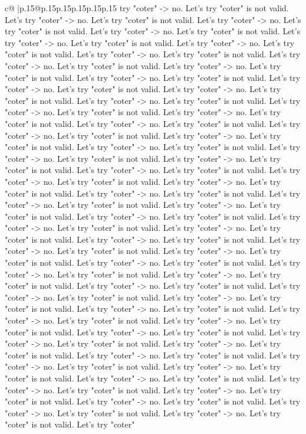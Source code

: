 \documentclass{article}
\begin{document}
{\begin{supertabular}{c@{$\;$}|p{.15\linewidth}@{}p{.15\linewidth}p{.15\linewidth}p{.15\linewidth}p{.15\linewidth}p{.15\linewidth}}
{{{try "coter" {-}> no. Let's try "coter" is not valid. Let's try "coter" {-}> no. Let's try "coter" is not valid. Let's try "coter" {-}> no. Let's try "coter" is not valid. Let's try "coter" {-}> no. Let's try "coter" is not valid. Let's try "coter" {-}> no. Let's try "coter" is not valid. Let's try "coter" {-}> no. Let's try "coter" is not valid. Let's try "coter" {-}> no. Let's try "coter" is not valid. Let's try "coter" {-}> no. Let's try "coter" is not valid. Let's try "coter" {-}> no. Let's try "coter" is not valid. Let's try "coter" {-}> no. Let's try "coter" is not valid. Let's try "coter" {-}> no. Let's try "coter" is not valid. Let's try "coter" {-}> no. Let's try "coter" is not valid. Let's try "coter" {-}> no. Let's try "coter" is not valid. Let's try "coter" {-}> no. Let's try "coter" is not valid. Let's try "coter" {-}> no. Let's try "coter" is not valid. Let's try "coter" {-}> no. Let's try "coter" is not valid. Let's try "coter" {-}> no. Let's try "coter" is not valid. Let's try "coter" {-}> no. Let's try "coter" is not valid. Let's try "coter" {-}> no. Let's try "coter" is not valid. Let's try "coter" {-}> no. Let's try "coter" is not valid. Let's try "coter" {-}> no. Let's try "coter" is not valid. Let's try "coter" {-}> no. Let's try "coter" is not valid. Let's try "coter" {-}> no. Let's try "coter" is not valid. Let's try "coter" {-}> no. Let's try "coter" is not valid. Let's try "coter" {-}> no. Let's try "coter" is not valid. Let's try "coter" {-}> no. Let's try "coter" is not valid. Let's try "coter" {-}> no. Let's try "coter" is not valid. Let's try "coter" {-}> no. Let's try "coter" is not valid. Let's try "coter" {-}> no. Let's try "coter" is not valid. Let's try "coter" {-}> no. Let's try "coter" is not valid. Let's try "coter" {-}> no. Let's try "coter" is not valid. Let's try "coter" {-}> no. Let's try "coter" is not valid. Let's try "coter" {-}> no. Let's try "coter" is not valid. Let's try "coter" {-}> no. Let's try "coter" is not valid. Let's try "coter" {-}> no. Let's try "coter" is not valid. Let's try "coter" {-}> no. Let's try "coter" is not valid. Let's try "coter" {-}> no. Let's try "coter" is not valid. Let's try "coter" {-}> no. Let's try "coter" is not valid. Let's try "coter" {-}> no. Let's try "coter" is not valid. Let's try "coter" {-}> no. Let's try "coter" is not valid. Let's try "coter" {-}> no. Let's try "coter" is not valid. Let's try "coter" {-}> no. Let's try "coter" is not valid. Let's try "coter" {-}> no. Let's try "coter" is not valid. Let's try "coter" {-}> no. Let's try "coter" is not valid. Let's try "coter" {-}> no. Let's try "coter" is not valid. Let's try "coter" {-}> no. Let's try "coter" is not valid. Let's try "coter" {-}> no. Let's try "coter" is not valid. Let's try "coter" {-}> no. Let's try "coter" is not valid. Let's try "coter" {-}> no. Let's try "coter" is not valid. Let's try "coter" {-}> no. Let's try "coter" is not valid. Let's try "coter" {-}> no. Let's try "coter" is not valid. Let's try "coter" {-}> no. Let's try "coter" is not valid. Let's try "coter" {-}> no. Let's try "coter" is not valid. Let's try "coter" {-}> no. Let's try "coter" is not valid. Let's try "coter" }}}
\end{supertabular}}
\end{document}

